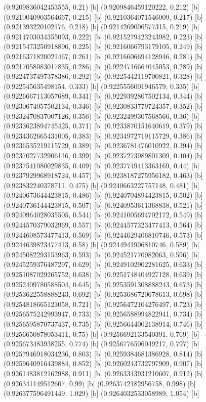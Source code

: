 {{{(0.9209836042453555, 0.21) [b] 
(0.9209846459120222, 0.212) [b] 
(0.9210040903564667, 0.215) [b] 
(0.9210364071546009, 0.217) [b] 
(0.921393220102176, 0.218) [b] 
(0.9214269006577315, 0.219) [b] 
(0.9214703034355093, 0.222) [b] 
(0.9215279423243982, 0.223) [b] 
(0.9215473250918896, 0.225) [b] 
(0.9216066793179105, 0.249) [b] 
(0.9216371820021467, 0.261) [b] 
(0.9216606694128946, 0.281) [b] 
(0.9217058083017835, 0.286) [b] 
(0.9224716664045053, 0.289) [b] 
(0.9224737497378386, 0.292) [b] 
(0.9225442119700821, 0.328) [b] 
(0.922545635498154, 0.333) [b] 
(0.9225556001946579, 0.335) [b] 
(0.9226667113057689, 0.341) [b] 
(0.9229392807502134, 0.344) [b] 
(0.9230674057502134, 0.346) [b] 
(0.9230833779724357, 0.352) [b] 
(0.9232470837007126, 0.356) [b] 
(0.9232499307568566, 0.36) [b] 
(0.9233623894745425, 0.371) [b] 
(0.9233870151640619, 0.379) [b] 
(0.9234362665431005, 0.383) [b] 
(0.9234972719115729, 0.386) [b] 
(0.9236535219115729, 0.389) [b] 
(0.9236781476010922, 0.394) [b] 
(0.9237027732906116, 0.399) [b] 
(0.9237273989801309, 0.404) [b] 
(0.9237541080029835, 0.409) [b] 
(0.9237749413363169, 0.44) [b] 
(0.9237929968918724, 0.457) [b] 
(0.9238187275956182, 0.463) [b] 
(0.923832240378711, 0.475) [b] 
(0.9240663227757148, 0.481) [b] 
(0.9240673644423815, 0.486) [b] 
(0.9240704894423815, 0.502) [b] 
(0.9240736144423815, 0.507) [b] 
(0.9240953611368838, 0.521) [b] 
(0.9240964028035505, 0.544) [b] 
(0.9241005694702172, 0.549) [b] 
(0.9244570379032969, 0.557) [b] 
(0.9244577323477413, 0.564) [b] 
(0.9244608573477413, 0.569) [b] 
(0.9244629406810746, 0.573) [b] 
(0.9244639823477413, 0.58) [b] 
(0.9244941906810746, 0.589) [b] 
(0.9245082293153963, 0.593) [b] 
(0.924521770982063, 0.596) [b] 
(0.9245259376487297, 0.629) [b] 
(0.9249102902281625, 0.633) [b] 
(0.9251087029265752, 0.638) [b] 
(0.9251748404927128, 0.639) [b] 
(0.9252409780588504, 0.645) [b] 
(0.9253591308888243, 0.673) [b] 
(0.9253622558888243, 0.692) [b] 
(0.9253686720678613, 0.698) [b] 
(0.9254818665123058, 0.721) [b] 
(0.9256472104276497, 0.723) [b] 
(0.9256575242993947, 0.733) [b] 
(0.9256588994822941, 0.734) [b] 
(0.9256595870737437, 0.735) [b] 
(0.9256644002138914, 0.746) [b] 
(0.9256650878053411, 0.75) [b] 
(0.9256692133540391, 0.769) [b] 
(0.925673483938255, 0.774) [b] 
(0.9256776506049217, 0.797) [b] 
(0.9257946918034236, 0.803) [b] 
(0.9259384681386928, 0.814) [b] 
(0.9259640916439884, 0.852) [b] 
(0.9260243732797909, 0.907) [b] 
(0.9261483812162988, 0.911) [b] 
(0.9263343931210607, 0.912) [b] 
(0.926341149512607, 0.99) [b] 
(0.9263742182956758, 0.998) [b] 
(0.926377596491449, 1.029) [b] 
(0.9264032533058989, 1.054) [b] 
}}}
